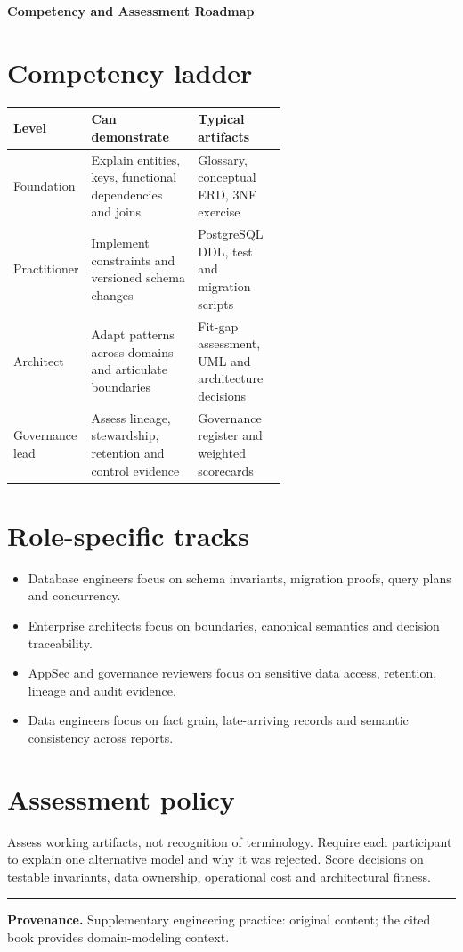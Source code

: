 \documentclass[11pt,letterpaper]{article}
\begin{document}
\begin{center}
{\LARGE\bfseries\color{navy} Competency and Assessment Roadmap}\par
\vspace{0.25em}{\large Roles, mastery checkpoints and evidence}\par
{}
\end{center}
\vspace{0.8em}
\section{Competency ladder}
\begin{tabularx}{\linewidth}{@{}>{\raggedright\arraybackslash}p{0.22\linewidth} >{\raggedright\arraybackslash}p{0.39\linewidth}>{\raggedright\arraybackslash}X@{}}
\toprule
\textbf{Level} & \textbf{Can demonstrate} & \textbf{Typical artifacts} \\ 
\midrule
Foundation & Explain entities, keys, functional dependencies and joins & Glossary, conceptual ERD, 3NF exercise \\ 
Practitioner & Implement constraints and versioned schema changes & PostgreSQL DDL, test and migration scripts \\ 
Architect & Adapt patterns across domains and articulate boundaries & Fit-gap assessment, UML and architecture decisions \\ 
Governance lead & Assess lineage, stewardship, retention and control evidence & Governance register and weighted scorecards \\ 
\bottomrule
\end{tabularx}

\section{Role-specific tracks}
\begin{itemize}
\item Database engineers focus on schema invariants, migration proofs, query plans and concurrency.
\item Enterprise architects focus on boundaries, canonical semantics and decision traceability.
\item AppSec and governance reviewers focus on sensitive data access, retention, lineage and audit evidence.
\item Data engineers focus on fact grain, late-arriving records and semantic consistency across reports.
\end{itemize}

\section{Assessment policy}
Assess working artifacts, not recognition of terminology. Require each participant to explain one alternative model and why it was rejected. Score decisions on testable invariants, data ownership, operational cost and architectural fitness.


\vfill
\hrule
{\footnotesize\textbf{Provenance.} Supplementary engineering practice: original content; the cited book provides domain-modeling context.}
\end{document}
